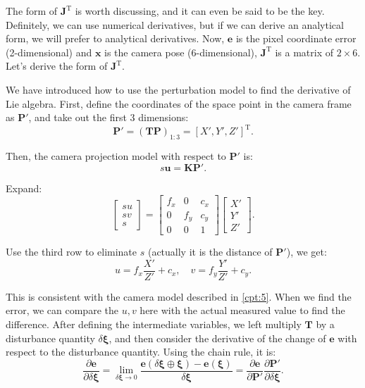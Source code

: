 The form of $\mathbf{J}^\mathrm{T}$ is worth discussing, and it can even be said to be the key. Definitely, we can use numerical derivatives, but if we can derive an analytical form, we will prefer to analytical derivatives. Now, $\mathbf{e}$ is the pixel coordinate error (2-dimensional) and $\mathbf{x}$ is the camera pose (6-dimensional), $\mathbf{J}^\mathrm{T}$ is a matrix of $2 \times 6$. Let's derive the form of $\mathbf{J}^\mathrm{T}$.

We have introduced how to use the perturbation model to find the derivative of Lie algebra. First, define the coordinates of the space point in the camera frame as $\mathbf{P}'$, and take out the first 3 dimensions:
\begin{equation}
\mathbf{P}' = \left( \mathbf{T}{\mathbf{P}} \right)_{1:3}= [X', Y', Z']^\mathrm{T}.
\end{equation}

Then, the camera projection model with respect to $\mathbf{P}'$ is:
\begin{equation}
s {\mathbf{u}} = \mathbf{K} \mathbf{P}'.
\end{equation}

Expand:
\begin{equation}
\left[ \begin{array}{l}
su\\
sv\\
s
\end{array} \right] = \left[ {\begin{array}{*{20}{c}}
	{{f_x}}&0&{{c_x}}\\
	0&{{f_y}}&{{c_y}}\\
	0&0&1
	\end{array}} \right]\left[ \begin{array}{l}
X'\\
Y'\\
Z'
\end{array} \right].
\end{equation}

Use the third row to eliminate $s$ (actually it is the distance of $\mathbf{P}'$), we get:
\begin{equation}
\label{eq:uv2xyz}
u = {f_x}\frac{{X'}}{{Z'}} + {c_x}, \quad v = {f_y}\frac{{Y'}}{{Z'}} + {c_y}.
\end{equation}

This is consistent with the camera model described in \ref{cpt:5}. When we find the error, we can compare the $u, v$ here with the actual measured value to find the difference. After defining the intermediate variables, we left multiply $\mathbf{T}$ by a disturbance quantity $\delta \boldsymbol{\xi}$, and then consider the derivative of the change of $\mathbf{e}$ with respect to the disturbance quantity. Using the chain rule, it is:
\begin{equation}
\frac{{\partial \mathbf{e}}}{{\partial \delta \boldsymbol{\xi} }} = \mathop {\lim }\limits_{\delta \boldsymbol{\xi}  \to 0} \frac{{\mathbf{e}\left( {\delta \boldsymbol{\xi}  \oplus \boldsymbol{\xi} } \right)-\mathbf{e}(\boldsymbol{\xi})}}{{\delta \boldsymbol{\xi} }}  = \frac{{\partial \mathbf{e}}}{{\partial \mathbf{P}'}}\frac{{\partial \mathbf{P}'}}{{\partial \delta \boldsymbol{\xi} }}.
\end{equation}

